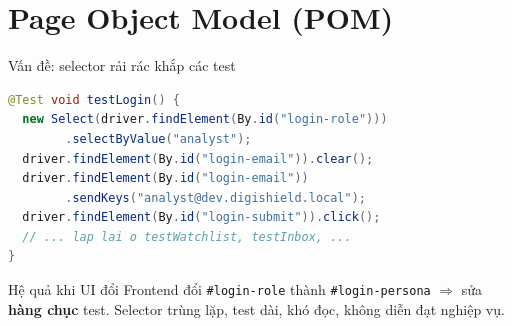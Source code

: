 \documentclass[aspectratio=169,12pt]{beamer}
\begin{document}
\section{Page Object Model (POM)}

\begin{frame}[fragile]{Vấn đề: selector rải rác khắp các test}
\begin{lstlisting}[language=Java]
@Test void testLogin() {
  new Select(driver.findElement(By.id("login-role")))
        .selectByValue("analyst");
  driver.findElement(By.id("login-email")).clear();
  driver.findElement(By.id("login-email"))
        .sendKeys("analyst@dev.digishield.local");
  driver.findElement(By.id("login-submit")).click();
  // ... lap lai o testWatchlist, testInbox, ...
}
\end{lstlisting}

  \begin{alertblock}{Hệ quả khi UI đổi}
    Frontend đổi \texttt{\#login-role} thành \texttt{\#login-persona}
    $\Rightarrow$ sửa \textbf{hàng chục} test. Selector trùng lặp,
    test dài, khó đọc, không diễn đạt nghiệp vụ.
  \end{alertblock}
\end{frame}
\end{document}
